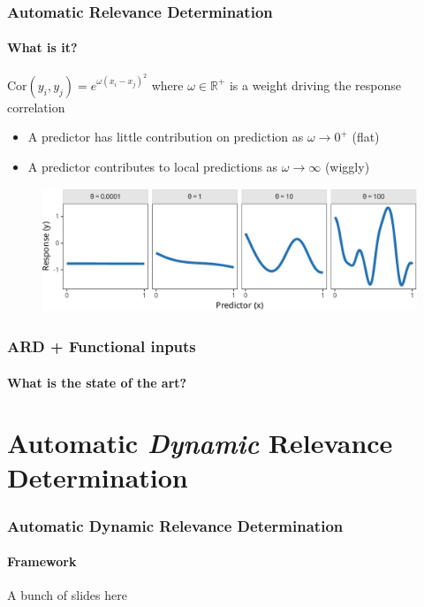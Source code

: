 \documentclass{snedecorbeamer}
\begin{document}
\begin{frame}
  \frametitle{Automatic Relevance Determination\cite{neal1998}}
  \framesubtitle{What is it?}

  $\mathrm{Cor}(y_i, y_j) = e^{\omega {(x_i - x_j)}^2}$
  where $\omega\in\mathbb{R}^+$ is a weight driving the response correlation

  \begin{itemize}
  \item A predictor has little contribution on prediction as $\omega\to0^+$
    (flat)
  \item A predictor contributes to local predictions as $\omega\to\infty$
    (wiggly)
  \end{itemize}

  \begin{figure}
    \centering
    \includegraphics[height=10em]{inc/ard_response_profiles.pdf}
  \end{figure}

\end{frame}

\begin{frame}[c]
  \frametitle{ARD + Functional inputs}
  \framesubtitle{What is the state of the art?}

  

\end{frame}

\section{Automatic \textit{Dynamic} Relevance Determination}

\begin{frame}
  \frametitle{Automatic Dynamic Relevance Determination}
  \framesubtitle{Framework}

  A bunch of slides here
\end{frame}
\end{document}
